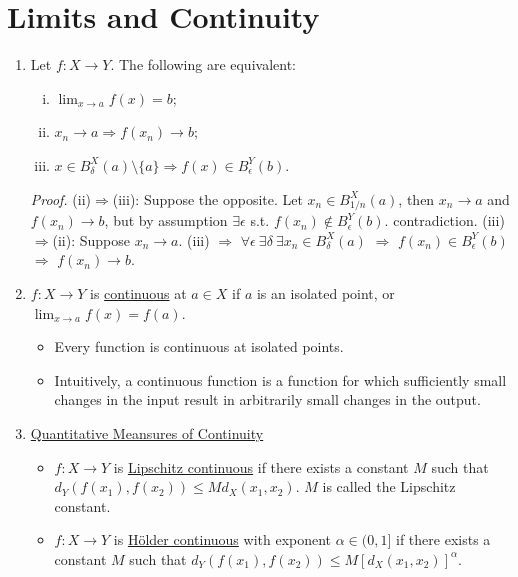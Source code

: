 \documentclass[%
 aip,
 jmp,%
 amsmath,amssymb,
 reprint,%
]{revtex4-1}
\def\a{\alpha}
\def\d{\delta}
\def\e{\epsilon}
\renewenvironment{proof}{\color{gray}\footnotesize\emph{Proof.}}{}
\newcommand{\imply}{\Rightarrow}
\newcommand{\defn}[1]{\underline{#1}}
\begin{document}
\section {Limits and Continuity}
\begin{enumerate}
  \item Let $f: X \to Y$. The following are equivalent:
      \begin{enumerate}[(i)]
        \item $\lim_{x \to a} f(x) = b$;
        \item $x_n \to a  \imply  f(x_n) \to b$;
        \item $x \in B_{\d}^{X}(a)\setminus\{a\} \imply f(x) \in B_{\e}^{Y}(b)$.
      \end{enumerate}
      \begin{proof}
        (ii)$\imply$(iii): Suppose the opposite. Let $x_n \in B_{1/n}^{X}(a)$,
        then $x_n \to a$ and $f(x_n) \to b$, but by assumption $\exists\e$ s.t.
        $f(x_n)\notin B_{\e}^{Y}(b)$. contradiction.
        (iii)$\imply$(ii): Suppose $x_n \to a$. (iii) $\imply$
        $\forall\e\ \exists\d\ \exists x_n\in B_{\d}^{X}(a)$ $\imply$
        $f(x_n)\in B_{\e}^{Y}(b)$ $\imply$ $f(x_n)\to b$.
      \end{proof}

  \item $f: X \to Y$ is \defn{continuous} at $a \in X$ if
  $a$ is an isolated point, or $\lim_{x\to a} f(x)=f(a)$.
      \begin{itemize}
        \item Every function is continuous at isolated points.
        \footnotesize
        \item Intuitively, a continuous function is a function for which
        sufficiently small changes in the input result in arbitrarily small
        changes in the output.
      \end{itemize}

  \item \defn{Quantitative Meansures of Continuity}
      \begin{itemize}
        \item $f:X \to Y$ is \defn{Lipschitz continuous} if there exists a
        constant $M$ such that $d_Y(f(x_1), f(x_2)) \leq M d_X(x_1,x_2)$.
        $M$ is called the Lipschitz constant.

        \item $f:X \to Y$ is \defn{H\"older continuous} with exponent $\a\in (0,1]$
        if there exists a constant $M$ such that
        $d_Y(f(x_1),f(x_2)) \leq M \left[d_X(x_1, x_2)\right]^{\a}$.
      \end{itemize}


\end{enumerate}
\end{document}
